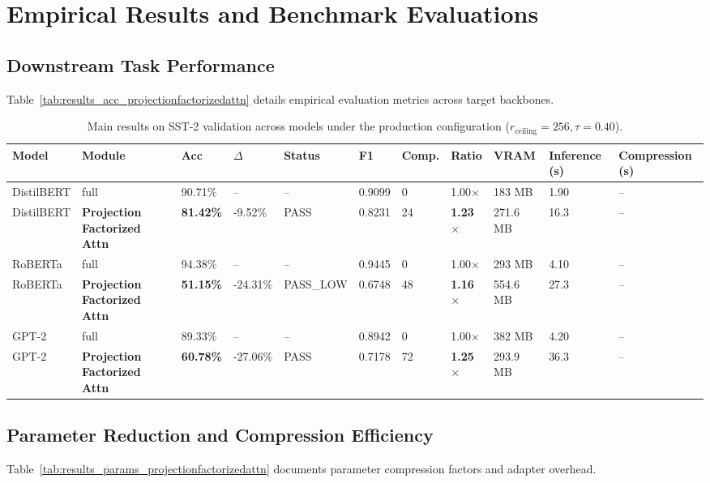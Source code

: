 \section{Empirical Results and Benchmark Evaluations}

\subsection{Downstream Task Performance}
Table~\ref{tab:results_acc_projectionfactorizedattn} details empirical evaluation metrics across target backbones.

\begin{table}[t]
\centering
\small
\begin{tabular}{lllllllllll}
\toprule
\textbf{Model} & \textbf{Module} & \textbf{Acc} & \textbf{$\Delta$} & \textbf{Status} & \textbf{F1} & \textbf{Comp.} & \textbf{Ratio} & \textbf{VRAM} & \textbf{Inference (s)} & \textbf{Compression (s)} \\
\midrule
DistilBERT & full & 90.71\% & -- & -- & 0.9099 & 0 & 1.00$\times$ & 183 MB & 1.90 & -- \\
DistilBERT & \textbf{Projection Factorized Attn} & \textbf{81.42\%} & -9.52\% & PASS & 0.8231 & 24 & \textbf{1.23$\times$} & 271.6 MB & 16.3 & -- \\
RoBERTa & full & 94.38\% & -- & -- & 0.9445 & 0 & 1.00$\times$ & 293 MB & 4.10 & -- \\
RoBERTa & \textbf{Projection Factorized Attn} & \textbf{51.15\%} & -24.31\% & PASS\_LOW & 0.6748 & 48 & \textbf{1.16$\times$} & 554.6 MB & 27.3 & -- \\
GPT-2 & full & 89.33\% & -- & -- & 0.8942 & 0 & 1.00$\times$ & 382 MB & 4.20 & -- \\
GPT-2 & \textbf{Projection Factorized Attn} & \textbf{60.78\%} & -27.06\% & PASS & 0.7178 & 72 & \textbf{1.25$\times$} & 293.9 MB & 36.3 & -- \\
\bottomrule
\end{tabular}
\caption{Main results on SST-2 validation across models under the production configuration ($r_{\mathrm{ceiling}}=256, \tau=0.40$).}
\label{tab:main_sst2}
\end{table}

\subsection{Parameter Reduction and Compression Efficiency}
Table~\ref{tab:results_params_projectionfactorizedattn} documents parameter compression factors and adapter overhead.

